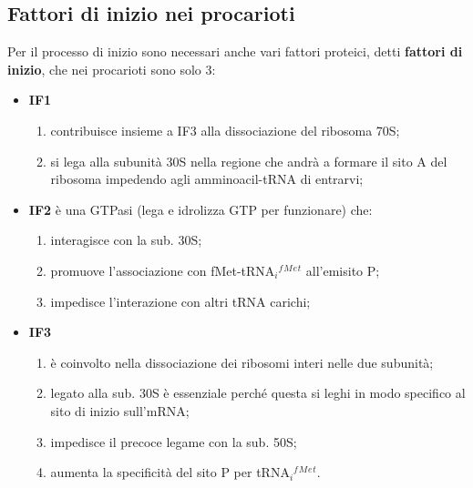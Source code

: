 \documentclass[11pt]{book}
\begin{document}
\subsection{Fattori di inizio nei
procarioti}\label{fattori-di-inizio-nei-procarioti}

Per il processo di inizio sono necessari anche vari fattori proteici,
detti \textbf{fattori di inizio}, che nei procarioti sono solo 3:

\begin{itemize}
\itemsep1pt\parskip0pt
\item
  \textbf{IF1}

  \begin{enumerate}
  \def\labelenumi{\arabic{enumi}.}
  \itemsep1pt\parskip0pt
  \item
    contribuisce insieme a IF3 alla dissociazione del ribosoma 70S;
  \item
    si lega alla subunità 30S nella regione che andrà a formare il sito
    A del ribosoma impedendo agli amminoacil-tRNA di entrarvi;
  \end{enumerate}
\item
  \textbf{IF2} è una GTPasi (lega e idrolizza GTP per funzionare) che:

  \begin{enumerate}
  \def\labelenumi{\arabic{enumi}.}
  \itemsep1pt\parskip0pt
  \item
    interagisce con la sub. 30S;
  \item
    promuove l'associazione con fMet-tRNA\(_i\)\(^f\)\(^M\)\(^e\)\(^t\)
    all'emisito P;
  \item
    impedisce l'interazione con altri tRNA carichi;
  \end{enumerate}
\item
  \textbf{IF3}

  \begin{enumerate}
  \def\labelenumi{\arabic{enumi}.}
  \itemsep1pt\parskip0pt
  \item
    è coinvolto nella dissociazione dei ribosomi interi nelle due
    subunità;
  \item
    legato alla sub. 30S è essenziale perché questa si leghi in modo
    specifico al sito di inizio sull'mRNA;
  \item
    impedisce il precoce legame con la sub. 50S;
  \item
    aumenta la specificità del sito P per
    tRNA\(_i\)\(^f\)\(^M\)\(^e\)\(^t\).
  \end{enumerate}
\end{itemize}
\end{document}
